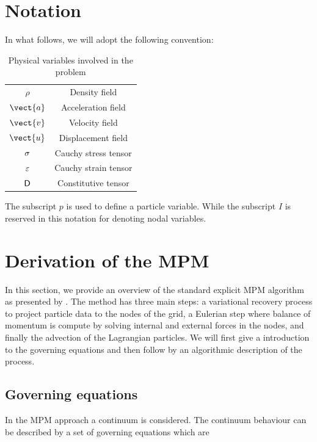 \section{Notation}
\label{sec:Notation}
In what follows, we will adopt the following convention:
\begin{table}[h]
  \centering
  \caption{Physical variables involved in the problem}
  \label{tab:notation-table}
  \begin{tabular}{c c}
    $\rho$ & Density field \\
    $\vect{a}$ & Acceleration field \\
    $\vect{v}$ & Velocity field \\
    $\vect{u}$ & Displacement field \\
    $\mathsf{\sigma}$ & Cauchy stress tensor \\
    $\mathsf{\varepsilon}$ & Cauchy strain tensor\\
    $\mathsf{D}$ & Constitutive tensor \\
  \end{tabular}
\end{table}

The subscript $p$ is used to define a particle variable. While the subscript $I$ is reserved in this
notation for denoting nodal variables. 

\section{Derivation of the MPM}
\label{sec:derivation-mpm}
In this section, we provide an overview of the standard explicit MPM
algorithm as presented by \cite{Sulsky1994}. The method has three main
steps: a variational recovery process to project particle data to the
nodes of the grid, a Eulerian step where balance of momentum is
compute by solving internal and external forces in the nodes, and
finally the advection of the Lagrangian particles. We will first give
a introduction to the governing equations and then follow by an
algorithmic description of the process.

\subsection{Governing equations }
\label{sec:governing-equations}
In the MPM approach a continuum is considered. The continuum behaviour
can be described by a set of governing equations which are

